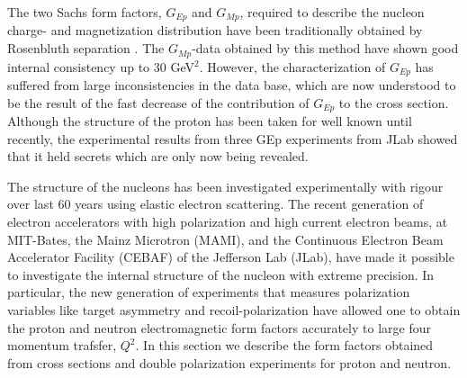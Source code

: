 The two Sachs form factors, $G_{Ep}$ and $G_{Mp}$, required 
to describe the nucleon charge- and magnetization distribution have been 
traditionally obtained by Rosenbluth separation \cite{rosen}. The $G_{Mp}$-data 
obtained by this method have shown good internal consistency
up to 30 GeV$^2$. However, the characterization of $G_{Ep}$ has suffered from 
large inconsistencies in the data base, which are now understood to be the 
result of the fast decrease of the contribution of $G_{Ep}$ to the cross section.
Although the structure of the proton has been taken for well 
known until recently, the experimental results from three GEp experiments from JLab
showed that it held secrets which are only now being revealed.      

The structure of the nucleons has been investigated experimentally with rigour  
over last 60 years using elastic electron scattering. 
The recent generation of electron accelerators with high polarization and high current electron beams, at MIT-Bates, the Mainz
Microtron (MAMI), and the Continuous Electron Beam Accelerator Facility (CEBAF)
of the Jefferson Lab (JLab), have made it possible to investigate the internal structure of the nucleon with 
extreme precision. In particular, the new generation of experiments that measures polarization variables like
target asymmetry and recoil-polarization have
allowed one to obtain the proton and neutron electromagnetic form factors accurately to large four momentum trafsfer, $Q^2$.
In this section we describe the form factors obtained from cross sections and double polarization experiments for 
proton and neutron.
